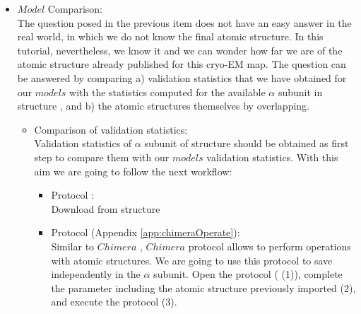 \begin{itemize}
 \item $Model$ Comparison:\\
 
 The question posed in the previous item does not have an easy answer in the real world, in which we do not know the final atomic structure. In this tutorial, nevertheless, we know it and we can wonder how far we are of the atomic structure already published for this cryo-EM map. The question can be answered by comparing a) validation statistics that we have obtained for our $models$ with the statistics computed for the available $\alpha$ subunit in  structure , and b) the atomic structures themselves by overlapping.\\ 
    
  \begin{itemize}
  \item Comparison of validation statistics: \\
  
  Validation statistics of  $\alpha$ subunit of  structure  should be obtained as first step to compare them with our $models$ validation statistics. With this aim we are going to follow the next workflow:\\
  \begin{itemize}
    \item Protocol :\\
    Download from  structure \\
    
    \item Protocol  (Appendix \ref{app:chimeraOperate}):\\
    Similar to $Chimera$ , $Chimera$  protocol allows to perform operations with atomic structures. We are going to use this protocol to save independently in \scipion the  $\alpha$ subunit. Open the protocol  ( (1)), complete the parameter  including the atomic structure  previously imported (2), and execute the protocol (3).      
    

\end{itemize}
\end{itemize}
\end{itemize}
